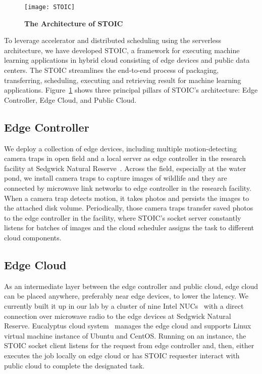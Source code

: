 \begin{figure}
    \centering
    \texttt{[image: STOIC]}
    \caption{\textbf{The Architecture of STOIC}}
    \label{fig:STOIC}
\end{figure}

To leverage accelerator and distributed scheduling using the serverless architecture, we have developed STOIC, a framework for executing machine learning applications in hybrid cloud consisting of edge devices and public data centers. The STOIC streamlines the end-to-end process of packaging, transferring, scheduling, executing and retrieving result for machine learning applications. Figure~\ref{fig:STOIC} shows three principal pillars of STOIC's architecture: Edge Controller, Edge Cloud, and Public Cloud.

\subsection{Edge Controller}
 We deploy a collection of edge devices, including multiple motion-detecting camera traps in open field and a local server as edge controller in the research facility at Sedgwick Natural Reserve~\cite{ref:sedgwick}. Across the field, especially at the water pond, we install camera traps to capture images of wildlife and they are connected by microwave link networks to edge controller in the research facility. When a camera trap detects motion, it takes photos and persists the images to the attached disk volume. Periodically, those camera traps transfer saved photos to the edge controller in the facility, where STOIC's socket server constantly listens for batches of images and the cloud scheduler assigns the task to different cloud components. 
 
 \subsection{Edge Cloud}
 
 As an intermediate layer between the edge controller and public cloud, edge cloud can be placed anywhere, preferably near edge devices, to lower the latency. We currently built it up in our lab by a cluster of nine Intel NUCs~\cite{ref:nucs} with a direct connection over microwave radio to the edge devices at Sedgwick Natural Reserve. Eucalyptus cloud system~\cite{ref:euca} manages the edge cloud and supports Linux virtual machine instance of Ubuntu and CentOS. Running on an instance, the STOIC socket client listens for the request from edge controller and, then, either executes the job locally on edge cloud or has STOIC requester interact with public cloud to complete the designated task.
 
